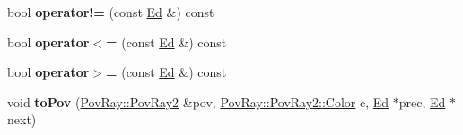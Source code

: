 \begin{DoxyCompactItemize}
bool {\bfseries operator!=} (const \mbox{\hyperlink{classetvo_i_i_1_1_ed}{Ed}} \&) const
\item 
\mbox{\label{classetvo_i_i_1_1_ed_a68dd406c9c10f053765482fb183031a0}} 
bool {\bfseries operator$<$=} (const \mbox{\hyperlink{classetvo_i_i_1_1_ed}{Ed}} \&) const
\item 
\mbox{\label{classetvo_i_i_1_1_ed_ad9022c8d29fbb809f72db8f8e716009c}} 
bool {\bfseries operator$>$=} (const \mbox{\hyperlink{classetvo_i_i_1_1_ed}{Ed}} \&) const
\item 
\mbox{\label{classetvo_i_i_1_1_ed_aa3bf926f528bd660b62439f5bfead74e}} 
void {\bfseries to\+Pov} (\mbox{\hyperlink{class_pov_ray_1_1_pov_ray2}{Pov\+Ray\+::\+Pov\+Ray2}} \&pov, \mbox{\hyperlink{class_pov_ray_1_1_pov_ray2_1_1_color}{Pov\+Ray\+::\+Pov\+Ray2\+::\+Color}} c, \mbox{\hyperlink{classetvo_i_i_1_1_ed}{Ed}} $\ast$prec, \mbox{\hyperlink{classetvo_i_i_1_1_ed}{Ed}} $\ast$next)
\end{DoxyCompactItemize}
